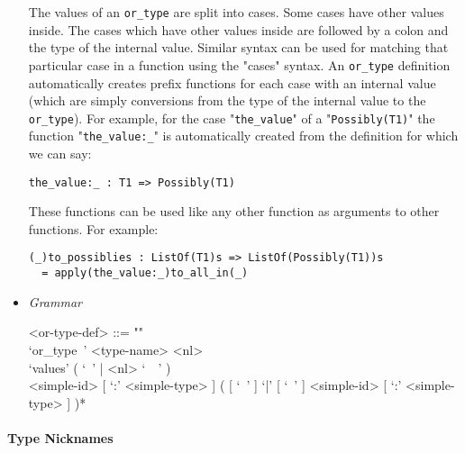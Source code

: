 \documentclass{article}
\begin{document}
\begin{itemize}
The values of an \verb|or_type| are split into cases. Some cases have other
values inside.  The cases which have other values inside are followed by a
colon and the type of the internal value. Similar syntax can be used for
matching that particular case in a function using the "cases" syntax.  An
\verb|or_type| definition automatically creates prefix functions for each case
with an internal value (which are simply conversions from the type of the
internal value to the \verb|or_type|).  For example, for the case
"\verb|the_value|" of a "\verb|Possibly(T1)|" the function "\verb|the_value:_|"
is automatically created from the definition for which we can say:
\begin{verbatim}
the_value:_ : T1 => Possibly(T1)
\end{verbatim}
These functions can be used like any other function as arguments to other
functions.  For example:
\begin{verbatim}
(_)to_possiblies : ListOf(T1)s => ListOf(Possibly(T1))s
  = apply(the_value:_)to_all_in(_)
\end{verbatim}

\item \textit{Grammar}

\begin{grammar}
<or-type-def> ::= ""\\
`or_type\ ' <type-name> <nl> \\
`values' ( `\ ' | <nl> `\ \ ' ) \\
<simple-id> [ `:' <simple-type> ]
( [ `\ ' ] `|' [ `\ ' ] <simple-id> [ `:' <simple-type> ] )*
\end{grammar}

\end{itemize}

\paragraph{Type Nicknames}
\end{document}
